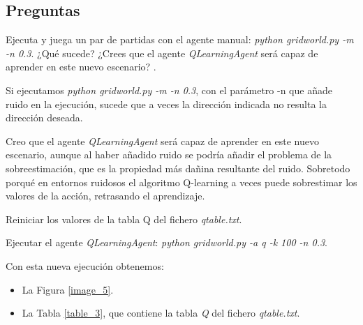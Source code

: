 \documentclass[11pt]{exam}
\begin{document}
\subsection*{Preguntas}

\begin{questions}

{ \question Ejecuta y juega un par de partidas con el agente manual: \textit{python gridworld.py -m -n 0.3}. ¿Qué sucede? ¿Crees que el agente \textit{QLearningAgent} será capaz de aprender en este nuevo escenario? \label{pregunta_1.2}.
}

Si ejecutamos \textit{python gridworld.py -m -n 0.3}, con el parámetro -n que añade ruido en la ejecución, sucede que a veces la dirección indicada no resulta la dirección deseada.

Creo que el agente \textit{QLearningAgent} será capaz de aprender en este nuevo escenario, aunque al haber añadido ruido se podría añadir el problema de la sobreestimación, que es la propiedad más dañina resultante del ruido. Sobretodo porqué en entornos ruidosos el algoritmo Q-learning a veces puede sobrestimar los valores de la acción, retrasando el aprendizaje.

{ \question Reiniciar los valores de la tabla Q del fichero \textit{qtable.txt}.}

{ \question Ejecutar el agente \textit{QLearningAgent}: \textit{python gridworld.py -a q -k 100 -n 0.3}.}

Con esta nueva ejecución obtenemos:

\begin{itemize}
	\item La Figura \ref{image_5}.
	\item La Tabla \ref{table_3}, que contiene la tabla \textit{Q} del fichero \textit{qtable.txt}.
\end{itemize}

\renewcommand{\tablename}{Tabla}


\end{questions}
\end{document}
